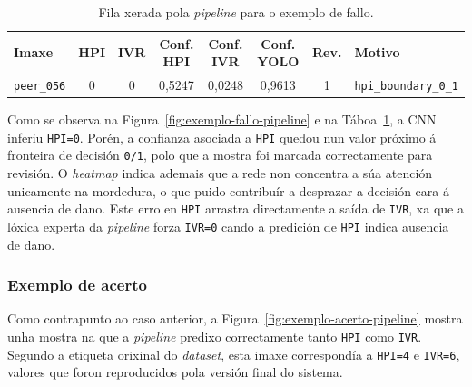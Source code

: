 {
\begin{table}[htbp]
    \centering
    \scriptsize
    \setlength{\tabcolsep}{3pt}
    \begin{tabular}{p{}|c|c|c|c|c|c|p{}}
        \rowcolor{udcpink!25}
        \textbf{Imaxe} & \textbf{HPI} & \textbf{IVR} & \textbf{Conf. HPI} & \textbf{Conf. IVR} & \textbf{Conf. YOLO} & \textbf{Rev.} & \textbf{Motivo} \\\hline
        \texttt{peer\_056} & 0 & 0 & 0,5247 & 0,0248 & 0,9613 & 1 & \texttt{hpi\_boundary\_0\_1} \\
    \end{tabular}
    \caption{Fila xerada pola \textit{pipeline} para o exemplo de fallo.}
    \label{tab:exemplo-fallo-pipeline}
\end{table}
}

Como se observa na Figura~\ref{fig:exemplo-fallo-pipeline} e na
Táboa~\ref{tab:exemplo-fallo-pipeline}, a CNN inferiu \texttt{HPI=0}. Porén, a confianza asociada a
\texttt{HPI} quedou nun valor próximo á fronteira de decisión \texttt{0/1}, polo que a mostra foi
marcada correctamente para revisión. O \textit{heatmap} indica ademais que a rede non concentra a súa
atención unicamente na mordedura, o que puido contribuír a desprazar a decisión cara á ausencia de
dano. Este erro en \texttt{HPI} arrastra directamente a saída de \texttt{IVR}, xa que a lóxica experta
da \textit{pipeline} forza \texttt{IVR=0} cando a predición de \texttt{HPI} indica ausencia de dano.

\subsubsection{Exemplo de acerto}
Como contrapunto ao caso anterior, a Figura~\ref{fig:exemplo-acerto-pipeline} mostra unha mostra na
que a \textit{pipeline} predixo correctamente tanto \texttt{HPI} como \texttt{IVR}. Segundo a etiqueta
orixinal do \textit{dataset}, esta imaxe correspondía a \texttt{HPI=4} e \texttt{IVR=6}, valores que
foron reproducidos pola versión final do sistema.

